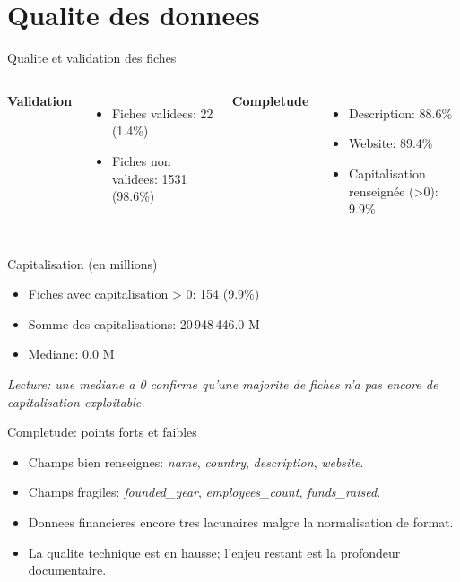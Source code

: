 \documentclass[aspectratio=169]{beamer}
\begin{document}
\section{Qualite des donnees}

\begin{frame}{Qualite et validation des fiches}
\begin{columns}[T]
\textbf{Validation}
\begin{itemize}
  \item Fiches validees: 22 (1.4\%)
  \item Fiches non validees: 1531 (98.6\%)
\end{itemize}

\textbf{Completude}
\begin{itemize}
  \item Description: 88.6\%
  \item Website: 89.4\%
  \item Capitalisation renseign\'ee (>0): 9.9\%
\end{itemize}
\end{columns}
\end{frame}

\begin{frame}{Capitalisation (en millions)}
\begin{itemize}
  \item Fiches avec capitalisation > 0: 154 (9.9\%)
  \item Somme des capitalisations: 20\,948\,446.0 M
  \item Mediane: 0.0 M
\end{itemize}

\vspace{0.5em}
\textit{Lecture: une mediane a 0 confirme qu'une majorite de fiches n'a pas encore de capitalisation exploitable.}
\end{frame}

\begin{frame}{Completude: points forts et faibles}
\begin{itemize}
  \item Champs bien renseignes: \textit{name}, \textit{country}, \textit{description}, \textit{website}.
  \item Champs fragiles: \textit{founded\_year}, \textit{employees\_count}, \textit{funds\_raised}.
  \item Donnees financieres encore tres lacunaires malgre la normalisation de format.
  \item La qualite technique est en hausse; l'enjeu restant est la profondeur documentaire.
\end{itemize}
\end{frame}
\end{document}
